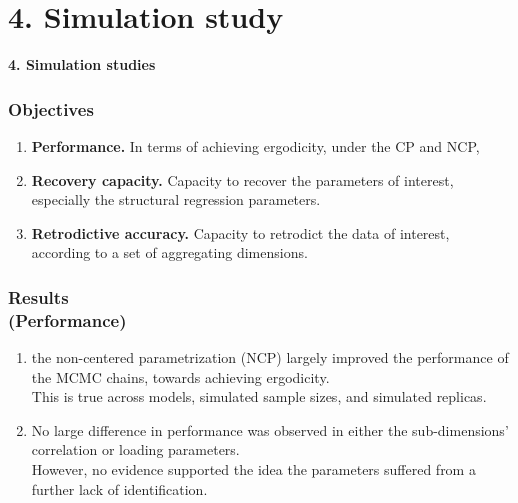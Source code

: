 \documentclass[arial,12pt,xcolor=dvipsnames]{beamer}
\begin{document}
\section{4. Simulation study}
%
\begin{frame}
	\textbf{4. Simulation studies}
\end{frame}
%
\begin{frame}
	\frametitle{Objectives}
	\begin{enumerate}
		\item \textbf{Performance.} In terms of achieving ergodicity, under the CP and NCP, 
		\item \textbf{Recovery capacity.} Capacity to recover the parameters of interest, especially the structural regression parameters.
		\item \textbf{Retrodictive accuracy.} Capacity to retrodict the data of interest, according to a set of aggregating dimensions.
	\end{enumerate} 
\end{frame}
%
\begin{frame}
	\frametitle{Results \\
		(Performance)}
	\begin{enumerate}
		\item the non-centered parametrization (NCP) largely
		improved the performance of the MCMC chains, towards achieving ergodicity.\\
		\vspace{0.3cm} This is true across models, simulated sample sizes, and simulated replicas.
		\item No large difference in performance was observed in either the sub-dimensions’ correlation or loading parameters.\\
		\vspace{0.3cm} However, no evidence supported the idea the parameters suffered from a further lack of identification.
	\end{enumerate} 
\end{frame}
%
\end{document}
